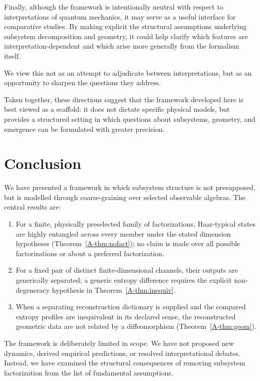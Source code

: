 \documentclass[12pt,a4paper,openany]{book}
\begin{document}
Finally, although the framework is intentionally neutral with respect to interpretations of quantum mechanics, it may serve as a useful interface for comparative studies. 
By making explicit the structural assumptions underlying subsystem decomposition and geometry, it could help clarify which features are interpretation-dependent and which arise more generally from the formalism itself.

We view this not as an attempt to adjudicate between interpretations, but as an opportunity to sharpen the questions they address.

\medskip

Taken together, these directions suggest that the framework developed here is best viewed as a scaffold: it does not dictate specific physical models, but provides a structured setting in which questions about subsystems, geometry, and emergence can be formulated with greater precision.

\section{Conclusion}
\label{A-sec:conclusion}

We have presented a framework in which subsystem structure is not presupposed, but is modelled through coarse-graining over selected observable algebras. 
The central results are:

\begin{enumerate}
\item For a finite, physically preselected family of factorizations, Haar-typical states are highly entangled across every member under the stated dimension hypotheses (Theorem~\ref{A-thm:nofact}); no claim is made over all possible factorizations or about a preferred factorization.
\item For a fixed pair of distinct finite-dimensional channels, their outputs are generically separated; a generic entropy difference requires the explicit non-degeneracy hypothesis in Theorem~\ref{A-thm:inequiv}.
\item When a separating reconstruction dictionary is supplied and the compared entropy profiles are inequivalent in its declared sense, the reconstructed geometric data are not related by a diffeomorphism (Theorem~\ref{A-thm:geom}).
\end{enumerate}

The framework is deliberately limited in scope. 
We have not proposed new dynamics, derived empirical predictions, or resolved interpretational debates. 
Instead, we have examined the structural consequences of removing subsystem factorization from the list of fundamental assumptions.
\end{document}
